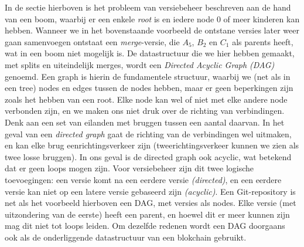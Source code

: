 \begin{aside}
In de sectie hierboven is het probleem van versiebeheer beschreven aan de hand van een boom, waarbij er een enkele \emph{root} is en iedere node 0 of meer kinderen kan hebben. Wanneer we in het bovenstaande voorbeeld de ontstane versies later weer gaan samenvoegen ontstaat een \emph{merge}-versie, die $A_5$, $B_2$ en $C_1$ als parents heeft, wat in een boom niet mogelijk is. De datastructuur die we hier hebben gemaakt, met splits en uiteindelijk merges, wordt een \emph{Directed Acyclic Graph (DAG)} genoemd. Een graph is hierin de fundamentele structuur, waarbij we (net als in een tree) nodes en edges tussen de nodes hebben, maar er geen beperkingen zijn zoals het hebben van een root. Elke node kan wel of niet met elke andere node verbonden zijn, en we maken ons niet druk over de richting van verbindingen. Denk aan een set van eilanden met bruggen tussen een aantal daarvan. In het geval van een \emph{directed graph} gaat de richting van de verbindingen wel uitmaken, en kan elke brug eenrichtingsverkeer zijn (tweerichtingsverkeer kunnen we zien als twee losse bruggen). In ons geval is de directed graph ook acyclic, wat betekend dat er geen loops mogen zijn. Voor versiebeheer zijn dit twee logische toevoegingen: een versie komt na een eerdere versie \emph{(directed)}, en een eerdere versie kan niet op een latere versie gebaseerd zijn \emph{(acyclic)}. Een Git-repository is net als het voorbeeld hierboven een DAG, met versies als nodes. Elke versie (met uitzondering van de eerste) heeft een parent, en hoewel dit er meer kunnen zijn mag dit niet tot loops leiden. Om dezelfde redenen wordt een DAG doorgaans ook als de onderliggende datastructuur van een blokchain gebruikt.
\end{aside}

